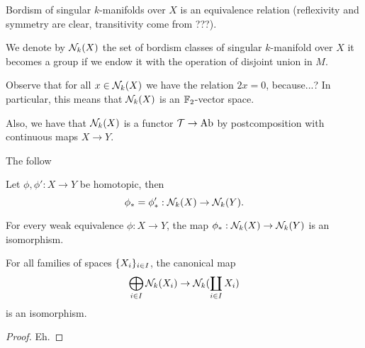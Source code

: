 Bordism of singular $k$-manifolds over $X$ is an equivalence relation (reflexivity and symmetry are clear, transitivity come from ???).

We denote by $\mathcal{N}_k(X)$ the set of bordism classes of singular $k$-manifold over $X$ it becomes a group if we endow it with the operation of disjoint union in $M$.

Observe that for all $x\in\mathcal{N}_k(X)$ we have the relation $2x=0$, because...? In particular, this means that $\mathcal{N}_k(X)$ is an $\mathbb{F}_2$-vector space.

Also, we have that $\mathcal{N}_k(X)$ is a functor $\mathcal{T}\to{\normalfont\textup{Ab}}$ by postcomposition with continuous maps $X\to Y$.

\begin{proposition}
The follow
\begin{rmnumerate}
    \item Let $\phi,\phi':X\to Y$ be homotopic, then \[\phi_*=\phi'_*:\Nn_k(X)\to\Nn_k(Y).\]
    
    \item For every weak equivalence $\phi:X\to Y$, the map $\phi_*:\Nn_k(X)\to\Nn_k(Y)$ is an isomorphism.
    
    \item For all families of spaces $\{X_i\}_{i\in I}$, the canonical map
    \[\bigoplus_{i\in I}\mathcal{N}_k(X_i)\to\mathcal{N}_k(\coprod_{i\in I}X_i)\]
    is an isomorphism.
\end{rmnumerate}
\end{proposition}

\begin{proof}
Eh.

\medskip
{}
\smallskip

\end{proof}
